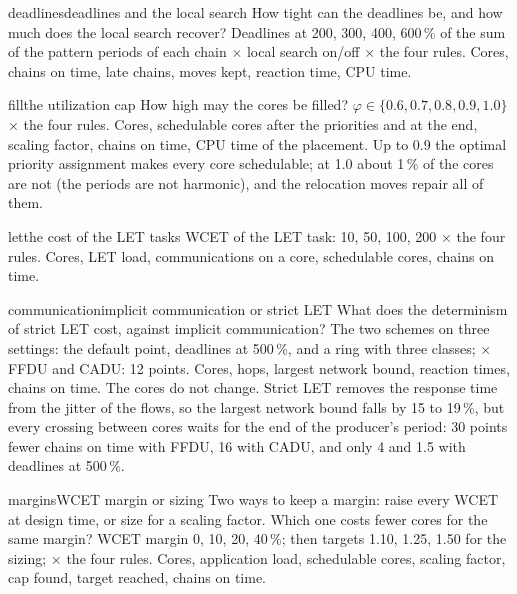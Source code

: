\begin{experimentbox}{deadlines}{deadlines and the local search}
 How tight can the deadlines be, and how much does the
local search recover?
 Deadlines at 200, 300, 400, 600\,\% of the sum of the
pattern periods of each chain $\times$ local search on/off $\times$ the
four rules.
 Cores, chains on time, late chains, moves kept, reaction
time, CPU time.
\end{experimentbox}

\begin{experimentbox}{fill}{the utilization cap}
 How high may the cores be filled?
 $\varphi \in \{0.6, 0.7, 0.8, 0.9, 1.0\}$ $\times$ the four
rules.
 Cores, schedulable cores after the priorities and at the
end, scaling factor, chains on time, CPU time of the placement.
 Up to 0.9 the optimal priority assignment makes every
core schedulable; at 1.0 about 1\,\% of the cores are not (the periods are
not harmonic), and the relocation moves repair all of them.
\end{experimentbox}

\begin{experimentbox}{let}{the cost of the LET tasks}
 WCET of the LET task: 10, 50, 100, 200\us{} $\times$ the
four rules.
 Cores, LET load, communications on a core, schedulable
cores, chains on time.
\end{experimentbox}

\begin{experimentbox}{communication}{implicit communication or strict LET}
 What does the determinism of strict LET cost, against
implicit communication?
 The two schemes on three settings: the default point,
deadlines at 500\,\%, and a ring with three classes; $\times$ FFDU and
CADU: 12 points.
 Cores, hops, largest network bound, reaction times,
chains on time.
 The cores do not change. Strict LET removes the response
time from the jitter of the flows, so the largest network bound falls by
15 to 19\,\%, but every crossing between cores waits for the end of the
producer's period: 30 points fewer chains on time with FFDU, 16 with CADU,
and only 4 and 1.5 with deadlines at 500\,\%.
\end{experimentbox}

\begin{experimentbox}{margins}{WCET margin or sizing}
 Two ways to keep a margin: raise every WCET at design
time, or size for a scaling factor. Which one costs fewer cores for the
same margin?
 WCET margin 0, 10, 20, 40\,\%; then targets 1.10, 1.25,
1.50 for the sizing; $\times$ the four rules.
 Cores, application load, schedulable cores, scaling
factor, cap found, target reached, chains on time.
\end{experimentbox}

